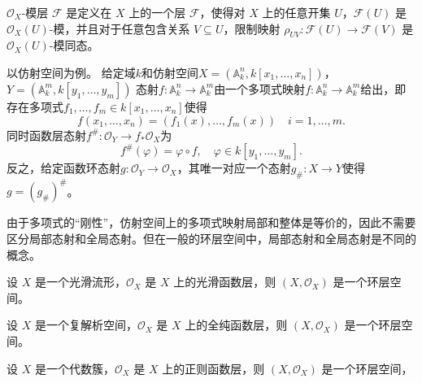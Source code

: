 \begin{definition}
    $\mathcal{O}_X$-模层 $\mathcal{F}$ 是定义在 $X$ 上的一个层 $\mathcal{F}$，使得对 $X$ 上的任意开集 $U$，$\mathcal{F}(U)$ 是 $\mathcal{O}_X(U)$-模，并且对于任意包含关系 $V\subseteq U$，限制映射 $\rho_{UV}:\mathcal{F}(U)\to \mathcal{F}(V)$ 是 $\mathcal{O}_X(U)$-模同态。
\end{definition}


以仿射空间为例。 给定域$k$和仿射空间$X=\left(\mathbb{A}_k^n,k[x_1,\ldots,x_n]\right)$，$Y=\left(\mathbb{A}_k^m,k[y_1,\ldots,y_m]\right)$
态射$f:\mathbb{A}^n_k \rightarrow \mathbb{A}^m_k$由一个多项式映射$f:\mathbb{A}^n_k\rightarrow \mathbb{A}^m_k$给出，即存在多项式$f_1,\ldots,f_m\in k[x_1,\ldots,x_n]$使得
\begin{equation*}
    f(x_1,\ldots,x_n)=(f_1(x),\ldots,f_m(x)) \quad i=1,\ldots,m.
\end{equation*}
同时函数层态射$f^\#:\mathcal{O}_Y\rightarrow f_*\mathcal{O}_X$为
\begin{equation*}
    f^\#(\varphi)=\varphi\circ f , \quad \varphi \in k[y_1,\ldots,y_m].
\end{equation*}
反之，给定函数环态射$g:\mathcal{O}_Y\rightarrow \mathcal{O}_X$，其唯一对应一个态射$g_{\#}:X\rightarrow Y$使得$g=(g_{\#})^\#$。
\begin{remark}
    由于多项式的“刚性”，仿射空间上的多项式映射局部和整体是等价的，因此不需要区分局部态射和全局态射。但在一般的环层空间中，局部态射和全局态射是不同的概念。
\end{remark}



\begin{example}
    设 $X$ 是一个光滑流形，$\mathcal{O}_X$ 是 $X$ 上的光滑函数层，则 $(X,\mathcal{O}_X)$ 是一个环层空间。
\end{example}
\begin{example}
    设 $X$ 是一个复解析空间，$\mathcal{O}_X$ 是 $X$ 上的全纯函数层，则 $(X,\mathcal{O}_X)$ 是一个环层空间。
\end{example}

\begin{example}
    设 $X$ 是一个代数簇，$\mathcal{O}_X$ 是 $X$ 上的正则函数层，则 $(X,\mathcal{O}_X)$ 是一个环层空间，
\end{example}









